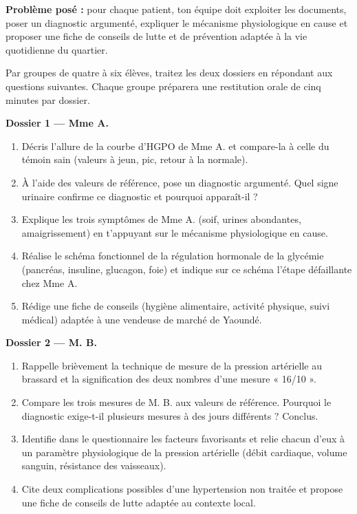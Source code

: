 \documentclass[11pt]{article}
\newcounter{popsec}
\newcounter{popsub}
\newcommand{\courssub}[1]{%
  \stepcounter{popsub}%
  \par\vspace{9pt}\noindent{\popxbold\fontsize{11.5}{13}\selectfont\color{popink}{\color{poporange}\thepopsec.\thepopsub}\hspace{6pt}#1}\par\nopagebreak\vspace{4pt}
}
\begin{document}
\textbf{Problème posé :} pour chaque patient, ton équipe doit exploiter les documents, poser un diagnostic argumenté, expliquer le mécanisme physiologique en cause et proposer une fiche de conseils de lutte et de prévention adaptée à la vie quotidienne du quartier.

\courssub{Consignes}

Par groupes de quatre à six élèves, traitez les deux dossiers en répondant aux questions suivantes. Chaque groupe préparera une restitution orale de cinq minutes par dossier.

\textbf{Dossier 1 — Mme A.}

\begin{enumerate}
\item Décris l'allure de la courbe d'HGPO de Mme A. et compare-la à celle du témoin sain (valeurs à jeun, pic, retour à la normale).
\item À l'aide des valeurs de référence, pose un diagnostic argumenté. Quel signe urinaire confirme ce diagnostic et pourquoi apparaît-il ?
\item Explique les trois symptômes de Mme A. (soif, urines abondantes, amaigrissement) en t'appuyant sur le mécanisme physiologique en cause.
\item Réalise le schéma fonctionnel de la régulation hormonale de la glycémie (pancréas, insuline, glucagon, foie) et indique sur ce schéma l'étape défaillante chez Mme A.
\item Rédige une fiche de conseils (hygiène alimentaire, activité physique, suivi médical) adaptée à une vendeuse de marché de Yaoundé.
\end{enumerate}

\textbf{Dossier 2 — M. B.}

\begin{enumerate}
\item Rappelle brièvement la technique de mesure de la pression artérielle au brassard et la signification des deux nombres d'une mesure « 16/10 ».
\item Compare les trois mesures de M. B. aux valeurs de référence. Pourquoi le diagnostic exige-t-il plusieurs mesures à des jours différents ? Conclus.
\item Identifie dans le questionnaire les facteurs favorisants et relie chacun d'eux à un paramètre physiologique de la pression artérielle (débit cardiaque, volume sanguin, résistance des vaisseaux).
\item Cite deux complications possibles d'une hypertension non traitée et propose une fiche de conseils de lutte adaptée au contexte local.
\end{enumerate}
\end{document}
